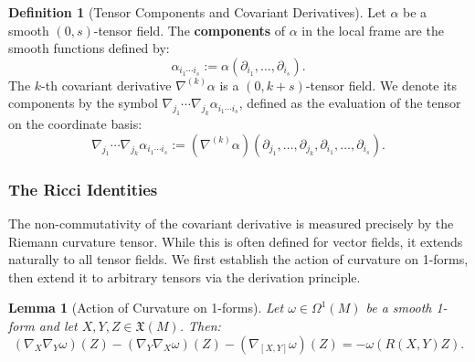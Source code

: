 \documentclass[11pt]{article}
\theoremstyle{plain}
\newtheorem{lemma}[theorem]{Lemma}
\theoremstyle{definition}
\newtheorem{definition}[theorem]{Definition}
\theoremstyle{remark}
\newcommand{\vspacesub}{\vspace{0pt}}
\begin{document}
\begin{definition}[Tensor Components and Covariant Derivatives]
\label{def:tensor_components}
    Let $\alpha$ be a smooth $(0,s)$-tensor field. The \textbf{components} of $\alpha$ in the local frame are the smooth functions defined by:
    \begin{equation}
        \alpha_{i_1 \cdots i_s} := \alpha (\partial_{i_1}, \ldots, \partial_{i_s}).
    \end{equation}
    The $k$-th covariant derivative $\nabla^{(k)} \alpha$ is a $(0, k+s)$-tensor field. We denote its components by the symbol $\nabla_{j_1}\cdots \nabla_{j_k} \alpha_{i_1 \cdots i_s}$, defined as the evaluation of the tensor on the coordinate basis:
    \begin{equation}
        \nabla_{j_1}\cdots \nabla_{j_k} \alpha_{i_1 \cdots i_s} := (\nabla^{(k)}\alpha) (\partial_{j_1}, \ldots, \partial_{j_k}, \partial_{i_1}, \ldots, \partial_{i_s}).
    \end{equation}
\end{definition}

\subsubsection{The Ricci Identities}
\vspacesub 

The non-commutativity of the covariant derivative is measured precisely by the Riemann curvature tensor. While this is often defined for vector fields, it extends naturally to all tensor fields. We first establish the action of curvature on 1-forms, then extend it to arbitrary tensors via the derivation principle.

\begin{lemma}[Action of Curvature on 1-forms]
\label{lem:curvature_on_1forms}
    Let $\omega \in \Omega^1(M)$ be a smooth 1-form and let $X, Y, Z \in \mathfrak{X}(M)$. Then:
    \begin{equation}\label{eq: commute CD 1-form}
        (\nabla_X \nabla_Y \omega)(Z) - (\nabla_Y \nabla_X \omega)(Z) - (\nabla_{[X,Y]} \omega)(Z) = - \omega(R(X,Y)Z).
    \end{equation}
\end{lemma}
\end{document}
